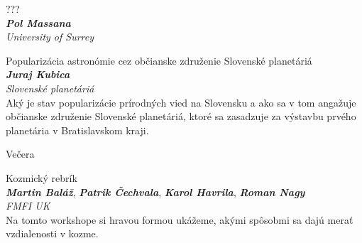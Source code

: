 \documentclass[a4paper]{report}
\begin{document}
                    \begin{tcolorbox}[
                                    colback=white,
                    colframe=black!70!white,
                                fonttitle=\Large\bfseries,
                title=16:00
            ]
                {\Large ???}
                                                            \\ \textbf{\textit{Pol Massana}}
                                                    \\ \textit{University of Surrey}                            \end{tcolorbox}
                    \begin{tcolorbox}[
                                    colback=white,
                    colframe=black!70!white,
                                fonttitle=\Large\bfseries,
                title=18:00
            ]
                {\Large Popularizácia astronómie cez občianske združenie Slovenské planetáriá}
                                                            \\ \textbf{\textit{Juraj Kubica}}
                                                    \\ \textit{Slovenské planetáriá}                \\[2ex]Aký je stav popularizácie prírodných vied na Slovensku a ako sa v tom angažuje občianske združenie Slovenské planetáriá, ktoré sa zasadzuje za výstavbu prvého planetária v Bratislavskom kraji.
            \end{tcolorbox}
                    \begin{tcolorbox}[
                                    colback=red!10,
                    colframe=red!50!black,
                                fonttitle=\Large\bfseries,
                title=19:00
            ]
                {\Large Večera}
                                                            \end{tcolorbox}
                    \begin{tcolorbox}[
                                    colback=blue!10,
                    colframe=black!50!blue,
                                fonttitle=\Large\bfseries,
                title=20:00
            ]
                {\Large Kozmický rebrík}
                                                            \\ \textit{\textbf{Martin Baláž}}, \textit{\textbf{Patrik Čechvala}}, \textit{\textbf{Karol Havrila}}, \textit{\textbf{Roman Nagy}}                                                    \\ \textit{FMFI UK}                \\[2ex]Na tomto workshope si hravou formou ukážeme, akými spôsobmi sa dajú merať vzdialenosti v kozme.
            \end{tcolorbox}
\end{document}
